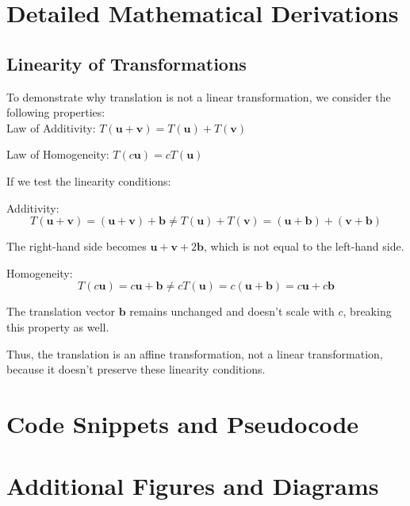\documentclass[12pt]{article}
\begin{document}
\appendix
\section{Detailed Mathematical Derivations}
\label{sec:appendix-derivations}

\subsection{Linearity of Transformations}
\label{sec:appendix-derivations-linear}
To demonstrate why translation is not a linear transformation, we consider the following properties: \\

Law of Additivity: \( T(\mathbf{u} + \mathbf{v}) = T(\mathbf{u}) + T(\mathbf{v}) \)

Law of Homogeneity: \( T(c\mathbf{u}) = cT(\mathbf{u}) \)

If we test the linearity conditions:

Additivity:
\[
    T(\mathbf{u} + \mathbf{v}) = (\mathbf{u} + \mathbf{v}) + \mathbf{b} \neq T(\mathbf{u}) + T(\mathbf{v}) = (\mathbf{u} + \mathbf{b}) + (\mathbf{v} + \mathbf{b})
\]

The right-hand side becomes \( \mathbf{u} + \mathbf{v} + 2\mathbf{b} \), which is not equal to the left-hand side.

Homogeneity:
\[
    T(c\mathbf{u}) = c\mathbf{u} + \mathbf{b} \neq cT(\mathbf{u}) = c(\mathbf{u} + \mathbf{b}) = c\mathbf{u} + c\mathbf{b}
\]

The translation vector \( \mathbf{b} \) remains unchanged and doesn’t scale with \( c \), breaking this property as well.

Thus, the translation is an affine transformation, not a linear transformation, because it doesn’t preserve these linearity conditions.

\section{Code Snippets and Pseudocode}
\label{sec:appendix-code}

\section{Additional Figures and Diagrams}
\label{sec:appendix-figures}
\end{document}
